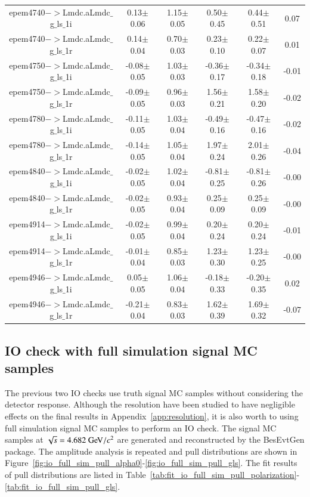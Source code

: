 \begin{table}[h]
{\begin{tabular}{cccccc}
epem4740$->$Lmdc.aLmdc$\_$g$\_$ls$\_$1i & 0.13$\pm$0.06 & 1.15$\pm$0.05 & 0.50$\pm$0.45 & 0.44$\pm$0.51 & 0.07 \\
epem4740$->$Lmdc.aLmdc$\_$g$\_$ls$\_$1r & 0.14$\pm$0.04 & 0.70$\pm$0.03 & 0.23$\pm$0.10 & 0.22$\pm$0.07 & 0.01 \\
epem4750$->$Lmdc.aLmdc$\_$g$\_$ls$\_$1i & -0.08$\pm$0.05 & 1.03$\pm$0.03 & -0.36$\pm$0.17 & -0.34$\pm$0.18 & -0.01 \\
epem4750$->$Lmdc.aLmdc$\_$g$\_$ls$\_$1r & -0.09$\pm$0.05 & 0.96$\pm$0.03 & 1.56$\pm$0.21 & 1.58$\pm$0.20 & -0.02 \\
epem4780$->$Lmdc.aLmdc$\_$g$\_$ls$\_$1i & -0.11$\pm$0.05 & 1.03$\pm$0.04 & -0.49$\pm$0.16 & -0.47$\pm$0.16 & -0.02 \\
epem4780$->$Lmdc.aLmdc$\_$g$\_$ls$\_$1r & -0.14$\pm$0.05 & 1.05$\pm$0.04 & 1.97$\pm$0.24 & 2.01$\pm$0.26 & -0.04 \\
epem4840$->$Lmdc.aLmdc$\_$g$\_$ls$\_$1i & -0.02$\pm$0.05 & 1.02$\pm$0.04 & -0.81$\pm$0.25 & -0.81$\pm$0.26 & -0.00 \\
epem4840$->$Lmdc.aLmdc$\_$g$\_$ls$\_$1r & -0.02$\pm$0.05 & 0.93$\pm$0.04 & 0.25$\pm$0.09 & 0.25$\pm$0.09 & -0.00 \\
epem4914$->$Lmdc.aLmdc$\_$g$\_$ls$\_$1i & -0.02$\pm$0.05 & 0.99$\pm$0.04 & 0.20$\pm$0.24 & 0.20$\pm$0.24 & -0.01 \\
epem4914$->$Lmdc.aLmdc$\_$g$\_$ls$\_$1r & -0.01$\pm$0.04 & 0.85$\pm$0.03 & 1.23$\pm$0.30 & 1.23$\pm$0.25 & -0.00 \\
epem4946$->$Lmdc.aLmdc$\_$g$\_$ls$\_$1i & 0.05$\pm$0.05 & 1.06$\pm$0.04 & -0.18$\pm$0.33 & -0.20$\pm$0.35 & 0.02 \\
epem4946$->$Lmdc.aLmdc$\_$g$\_$ls$\_$1r & -0.21$\pm$0.04 & 0.83$\pm$0.03 & 1.62$\pm$0.39 & 1.69$\pm$0.32 & -0.07 \\
        \hline\hline
        \end{tabular}
        }
\end{table}

\clearpage
\subsection{IO check with full simulation signal MC samples}

The previous two IO checks use truth signal MC samples without considering the detector response. Although the resolution have been studied to have negligible effects on the final results in Appendix~\ref{app:resolution}, it is also worth to using full simulation signal MC samples to perform an IO check. The signal MC samples at $\sqrt{s} = 4.682\gev/c^2$ are generated and reconstructed by the BesEvtGen package. The amplitude analysis is repeated and pull distributions are shown in Figure~\ref{fig:io_full_sim_pull_alpha0}-\ref{fig:io_full_sim_pull_gls}. The fit results of pull distributions are listed in Table~\ref{tab:fit_io_full_sim_pull_polarization}-\ref{tab:fit_io_full_sim_pull_gls}.


